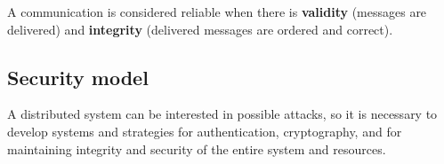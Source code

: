 \par
A communication is considered reliable when there is \textbf{validity} (messages are delivered) and \textbf{integrity} (delivered messages are ordered and correct).

\subsection{Security model}
A distributed system can be interested in possible attacks, so it is necessary to develop systems and strategies for authentication, cryptography, and for maintaining integrity and security of the entire system and resources.
